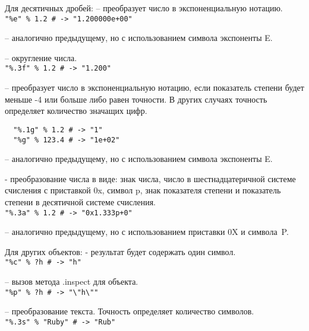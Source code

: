 \begin{keylist}{Для десятичных дробей:}
   – преобразует число в экспоненциальную нотацию.
  \\\verb!"%e" % 1.2 # -> "1.200000e+00"!
  
   – аналогично предыдущему, но с использованием символа экспоненты E.
  
   – округление числа.
  \\\verb!"%.3f" % 1.2 # -> "1.200"!
  
   – преобразует число в экспоненциальную нотацию, если показатель степени будет меньше -4 или больше либо равен точности. В других случаях точность определяет количество значащих цифр.
  \begin{verbatim}
  "%.1g" % 1.2 # -> "1"
  "%g" % 123.4 # -> "1e+02"
  \end{verbatim}
  
   – аналогично предыдущему, но с использованием символа экспоненты E.

   - преобразование числа в виде: знак числа, число в шестнадцатеричной системе счисления с приставкой 0x, символ p, знак показателя степени и показатель степени в десятичной системе счисления.
  \\\verb!"%.3a" % 1.2 # -> "0x1.333p+0"!
  
   – аналогично предыдущему, но с использованием приставки 0X и символа~P.
\end{keylist}

\begin{keylist}{Для других объектов:}
   - результат будет содержать один символ.
  \\\verb!"%с" % ?h # -> "h"!
  
   – вызов метода .inspect для объекта.
  \\\verb!"%p" % ?h # -> "\"h\""!
  
   – преобразование текста. Точность определяет количество символов.
  \\\verb!"%.3s" % "Ruby" # -> "Rub"!
\end{keylist}

